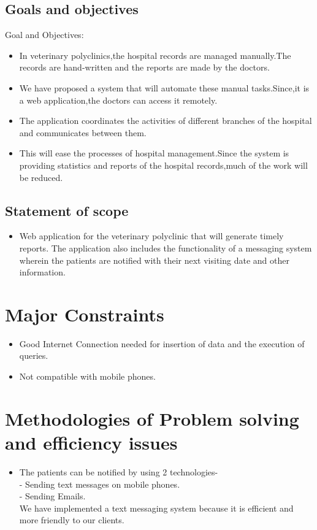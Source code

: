 \documentclass[oneside,a4paper,12pt]{book}
\begin{document}
\subsection{Goals and objectives}  
Goal and Objectives: 
\begin{itemize}
	\item  In veterinary polyclinics,the hospital records are managed manually.The records are hand-written and the reports are made by the doctors.
	\item We have proposed a system that will automate these manual tasks.Since,it is a web application,the doctors can access it remotely.
	\item The application coordinates the activities of different branches of the hospital and communicates between them.
	\item This will ease the processes of hospital management.Since the system is providing statistics and reports of the hospital records,much of the work will be reduced.
\end{itemize}

 \subsection{Statement of scope} 
	\begin{itemize}  
	\item Web application for the veterinary polyclinic that will generate timely reports. The application also includes the functionality of a messaging system wherein the patients are notified with their next visiting date and other information.
	\end{itemize}


\section{Major Constraints}
\begin{itemize}
\item Good Internet Connection needed for insertion of data and the execution of queries.
\item Not compatible with mobile phones.
\end{itemize}

\section{Methodologies of Problem solving and efficiency issues}
\begin{itemize}
	\item The patients can be notified by using 2 technologies- \\
	- Sending text messages on mobile phones.\\
	- Sending Emails.\\
	We have implemented a text messaging system because it is efficient and more friendly to our clients.
\end{itemize}
\end{document}
